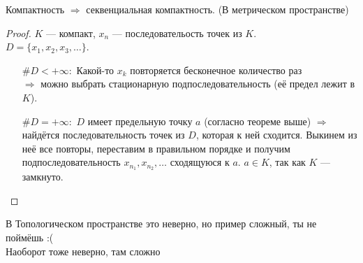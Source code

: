 \follow Компактность $\Longrightarrow$ секвенциальная компактность. (В метрическом пространстве)
\begin{proof}
    $K$ --- компакт, $x_n$ --- последовательость точек из $K$. \\
    $D = \{x_1,x_2,x_3,\dots \}$.
    \begin{itemize}
        \item[$\#D < +\infty:$] Какой-то $x_k$ повторяется бесконечное количество раз \\
        $\Longrightarrow$ можно выбрать стационарную подпоследовательность (её предел лежит в $K$).
        \item[$\#D = +\infty:$] $D$ имеет предельную точку $a$ (согласно теореме выше) $\Longrightarrow$ найдётся последовательность точек
        из $D$, которая к ней сходится. Выкинем из неё все повторы, переставим в правильном порядке и получим
        подпоследовательность $x_{n_1}, x_{n_2},\dots $ сходящуюся к $a$. $a \in K$, так как $K$ --- замкнуто.
    \end{itemize}
\end{proof}

\notice \quad

В Топологическом пространстве это неверно, но пример сложный, ты не поймёшь :( \\
Наоборот тоже неверно, там сложно

